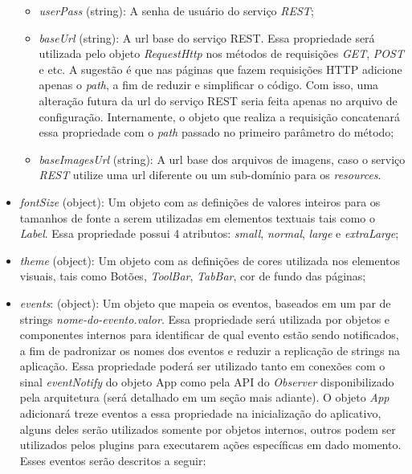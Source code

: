 \begin{itemize}
\begin{itemize}
		\item \textit{userPass} (string): A senha de usuário do serviço \textit{REST};

		\item \textit{baseUrl} (string): A url base do serviço REST. Essa propriedade será utilizada pelo objeto \textit{RequestHttp} nos métodos de requisições \textit{GET}, \textit{POST} e etc. A sugestão é que nas páginas que fazem requisições HTTP adicione apenas o \textit{path}, a fim de reduzir e simplificar o código. Com isso, uma alteração futura da url do serviço REST seria feita apenas no arquivo de configuração. Internamente, o objeto que realiza a requisição concatenará essa propriedade com o \textit{path} passado no primeiro parâmetro do método;

		\item \textit{baseImagesUrl} (string): A url base dos arquivos de imagens, caso o serviço \textit{REST} utilize uma url diferente ou um sub-domínio para os \textit{resources}.
	\end{itemize}

	\item \textit{fontSize} (object): Um objeto com as definições de valores inteiros para os tamanhos de fonte a serem utilizadas em elementos textuais tais como o \textit{Label}. Essa propriedade possui 4 atributos: \textit{small}, \textit{normal}, \textit{large} e \textit{extraLarge};

	\item \textit{theme} (object): Um objeto com as definições de cores utilizada nos elementos visuais, tais como Botões, \textit{ToolBar}, \textit{TabBar}, cor de fundo das páginas;

	\item \textit{events}: (object): Um objeto que mapeia os eventos, baseados em um par de strings \textit{nome-do-evento.valor}. Essa propriedade será utilizada por objetos e componentes internos para identificar de qual evento estão sendo notificados, a fim de padronizar os nomes dos eventos e reduzir a replicação de strings na aplicação. Essa propriedade poderá ser utilizado tanto em conexões com o sinal \textit{eventNotify} do objeto App como pela API do \textit{Observer} disponibilizado pela arquitetura (será detalhado em um seção mais adiante). O objeto \textit{App} adicionará treze eventos a essa propriedade na inicialização do aplicativo, alguns deles serão utilizados somente por objetos internos, outros podem ser utilizados pelos plugins para executarem ações específicas em dado momento. Esses eventos serão descritos a seguir:


\end{itemize}
